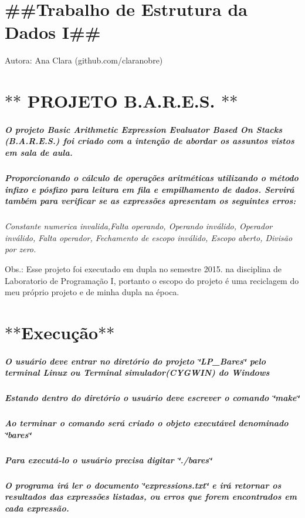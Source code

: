 \section*{\#\#\+Trabalho de Estrutura da Dados I\#\#}

Autora\+: Ana Clara (github.\+com/claranobre)

\section*{$\ast$$\ast$ P\+R\+O\+J\+E\+T\+O B.\+A.\+R.\+E.\+S. $\ast$$\ast$}

\subparagraph*{O projeto Basic Arithmetic Expression Evaluator Based On Stacks (B.\+A.\+R.\+E.\+S.) foi criado com a intenção de abordar os assuntos vistos em sala de aula.}

\subparagraph*{Proporcionando o cálculo de operações aritméticas utilizando o método infixo e pósfixo para leitura em fila e empilhamento de dados. Servirá também para verificar se as expressões apresentam os seguintes erros\+:}

{\itshape Constante numerica invalida,Falta operando, Operando inválido, Operador inválido, Falta operador, Fechamento de escopo inválido, Escopo aberto, Divisão por zero.}

Obs.\+: Esse projeto foi executado em dupla no semestre 2015. na disciplina de Laboratorio de Programação I, portanto o escopo do projeto é uma reciclagem do meu próprio projeto e de minha dupla na época.

\section*{$\ast$$\ast$\+Execução$\ast$$\ast$}

\subparagraph*{O usuário deve entrar no diretório do projeto \char`\"{}\+L\+P\+\_\+\+Bares\char`\"{} pelo terminal Linux ou Terminal simulador(\+C\+Y\+G\+W\+I\+N) do Windows}

\subparagraph*{Estando dentro do diretório o usuário deve escrever o comando \char`\"{}make\char`\"{}}

\subparagraph*{Ao terminar o comando será criado o objeto executável denominado \char`\"{}bares\char`\"{}}

\subparagraph*{Para executá-\/lo o usuário precisa digitar \char`\"{}./bares\char`\"{}}

\subparagraph*{O programa irá ler o documento \char`\"{}expressions.\+txt\char`\"{} e irá retornar os resultados das expressões listadas, ou erros que forem encontrados em cada expressão.}


